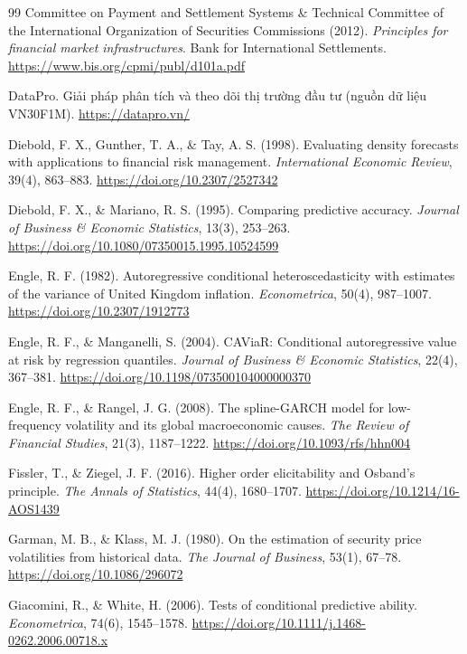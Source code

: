 \documentclass[12pt,a4paper]{article}
\theoremstyle{definition}
\theoremstyle{remark}
\begin{document}
\begin{thebibliography}{99}
 Committee on Payment and Settlement Systems \& Technical Committee of the International Organization of Securities Commissions (2012). \emph{Principles for financial market infrastructures}. Bank for International Settlements. \url{https://www.bis.org/cpmi/publ/d101a.pdf}

 DataPro. Giải pháp phân tích và theo dõi thị trường đầu tư (nguồn dữ liệu VN30F1M). \url{https://datapro.vn/}

 Diebold, F. X., Gunther, T. A., \& Tay, A. S. (1998). Evaluating density forecasts with applications to financial risk management. \emph{International Economic Review}, 39(4), 863--883. \url{https://doi.org/10.2307/2527342}

 Diebold, F. X., \& Mariano, R. S. (1995). Comparing predictive accuracy. \emph{Journal of Business \& Economic Statistics}, 13(3), 253--263. \url{https://doi.org/10.1080/07350015.1995.10524599}

 Engle, R. F. (1982). Autoregressive conditional heteroscedasticity with estimates of the variance of United Kingdom inflation. \emph{Econometrica}, 50(4), 987--1007. \url{https://doi.org/10.2307/1912773}

 Engle, R. F., \& Manganelli, S. (2004). CAViaR: Conditional autoregressive value at risk by regression quantiles. \emph{Journal of Business \& Economic Statistics}, 22(4), 367--381. \url{https://doi.org/10.1198/073500104000000370}

 Engle, R. F., \& Rangel, J. G. (2008). The spline-GARCH model for low-frequency volatility and its global macroeconomic causes. \emph{The Review of Financial Studies}, 21(3), 1187--1222. \url{https://doi.org/10.1093/rfs/hhn004}

 Fissler, T., \& Ziegel, J. F. (2016). Higher order elicitability and Osband's principle. \emph{The Annals of Statistics}, 44(4), 1680--1707. \url{https://doi.org/10.1214/16-AOS1439}

 Garman, M. B., \& Klass, M. J. (1980). On the estimation of security price volatilities from historical data. \emph{The Journal of Business}, 53(1), 67--78. \url{https://doi.org/10.1086/296072}

 Giacomini, R., \& White, H. (2006). Tests of conditional predictive ability. \emph{Econometrica}, 74(6), 1545--1578. \url{https://doi.org/10.1111/j.1468-0262.2006.00718.x}


\end{thebibliography}
\end{document}
